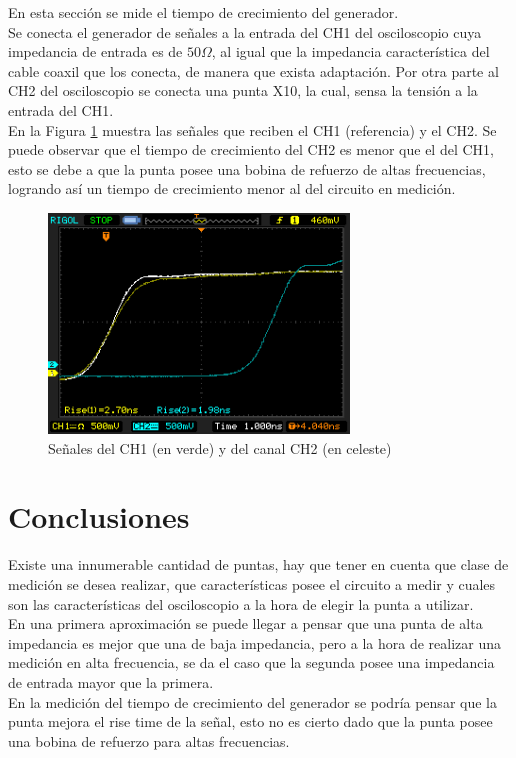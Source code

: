 \documentclass[a4paper,10pt]{article}
\begin{document}
		\indent En esta secci\'on se mide el tiempo de crecimiento del 
		generador. \\
 		\indent Se conecta el generador de se\~nales a la entrada del CH1 del
		osciloscopio cuya impedancia de entrada es de $50 \Omega$, al igual 
		que la impedancia caracter\'istica del cable coaxil que los conecta, 
		de manera que exista adaptaci\'on. Por otra parte al CH2 del 
		osciloscopio se conecta una punta X10, la cual, sensa la tensi\'on a 
		la entrada del CH1. \\
		\indent En la Figura \ref{img008} muestra las se\~nales que
		reciben el CH1 (referencia) y el CH2. Se puede observar que el tiempo
		de crecimiento del CH2 es menor que el del CH1, esto se debe a que la
		punta posee una bobina de refuerzo de altas frecuencias, logrando así
		un tiempo de crecimiento menor al del circuito en medición.
		
		\begin{figure}[!htb]
			\centering
			\includegraphics[width=8cm]
			{Imagenes/Mediciones instrumentos/NewFile10.png}
			\caption{Se\~nales del CH1 (en verde) y del canal CH2 (en celeste)
			} \label{img008}
		\end{figure}
	\newpage
	\section{Conclusiones}
	\indent Existe una innumerable cantidad de puntas, hay que tener en cuenta
	que clase de medición se desea realizar, que características posee el 
	circuito a medir y cuales son las características del osciloscopio a la 
	hora de elegir la punta a utilizar. \\
	\indent En una primera aproximación se puede llegar a pensar que una punta
	de alta impedancia es mejor que una de baja impedancia, pero a la hora de
	realizar una medición en alta frecuencia, se da el caso que la segunda 
	posee una impedancia de entrada mayor que la primera.\\
	\indent En la medición del tiempo de crecimiento del generador se podría
	pensar que la punta mejora el rise time de la señal, esto no es
	cierto dado que la punta posee una bobina de refuerzo para altas 
	frecuencias. 
	
\end{document}
